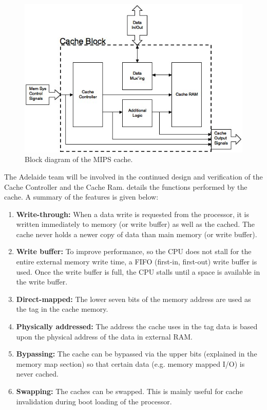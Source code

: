 \begin{figure}
\centering 
\includegraphics[width=\textwidth]{cacheblock.jpg}
\caption{Block diagram of the MIPS cache.}
\label{cacheblock}
\end{figure}

The Adelaide team will be involved in the continued design and
verification of the Cache Controller and the Cache Ram. \cite{hmcmemsys} details the functions performed by the cache. A summary of the features is given below:
\begin{enumerate}
\item \textbf{Write-through: }When a data write is requested from the processor, it is written immediately to memory (or write buffer) as well as the cached. The cache never holds a newer copy of data than main memory (or write buffer).
\item \textbf{Write buffer: }To improve performance, so the CPU does not stall for the entire external memory write time, a FIFO (first-in, first-out) write buffer is used. Once the write buffer is full, the CPU stalls until a space is available in the write buffer.
\item \textbf{Direct-mapped: }The lower seven bits of the memory address are used as the tag in the cache memory.
\item \textbf{Physically addressed: }The address the cache uses in the tag data is based upon the physical address of the data in external RAM.
\item \textbf{Bypassing: }The cache can be bypassed via the upper bits (explained in the memory map section) so that certain data (e.g. memory mapped I/O) is never cached.
\item \textbf{Swapping: }The caches can be swapped. This is mainly useful for cache invalidation during boot loading of the processor. 
\end{enumerate}

